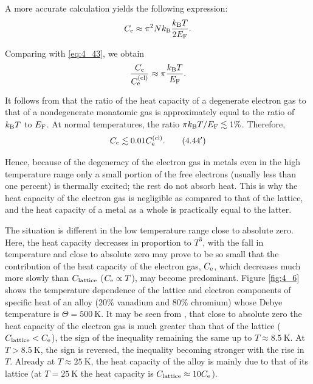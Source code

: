 A more accurate calculation yields the following expression:
\begin{equation}\label{eq:4_43}
    C_{\text{e}} \approx \pi^2 N k_{\text{B}} \frac{k_{\text{B}} T}{2 E_{\text{F}}}.
\end{equation}

\noindent
Comparing  with \eqref{eq:4_43}, we obtain
\begin{equation}\label{eq:4_44}
    \frac{C_{\text{e}}}{C_{\text{e}}^{\text{(cl)}}} \approx \pi \frac{k_{\text{B}} T}{E_{\text{F}}}.
\end{equation}

It follows from  that the ratio of the heat capacity of a degenerate electron gas to that of a nondegenerate monatomic gas is approximately equal to the ratio of $k_{\text{B}}T$ to $E_{\text{F}}$. At normal temperatures, the ratio $\pi k_{\text{B}}T/E_{\text{F}}\lesssim 1\%$. Therefore,
\begin{equation}\label{eq:4_44p}
    C_{\text{e}} \lesssim 0.01 C_{\text{e}}^{\text{(cl)}}. \tag{4.44$'$}
\end{equation}

Hence, because of the degeneracy of the electron gas in metals even in the high temperature range only a small portion of the free electrons (usually less than one percent) is thermally excited; the rest do not absorb heat. This is why the heat capacity of the electron gas is negligible as compared to that of the lattice, and the heat capacity of a metal as a whole is practically equal to the latter.

The situation is different in the low temperature range close to absolute zero. Here, the heat capacity decreases in proportion to $T^3$, with the fall in temperature and close to absolute zero may prove to be so small that the contribution of the heat capacity of the electron gas, $C_{\text{e}}$, which decreases much more slowly than $C_{\text{lattice}}$ ($C_{\text{e}}\propto T$), may become predominant. Figure \ref{fig:4_6} shows the temperature dependence of the lattice and electron components of specific heat of an alloy ($20\%$ vanadium and $80\%$ chromium) whose Debye temperature is $\Theta=\SI{500}{\kelvin}$.
It may be seen from , that close to absolute zero the heat capacity of the electron gas is much greater than that of the lattice ($C_{\text{lattice}}<C_{\text{e}}$), the sign of the inequality remaining the same up to $T\approx\SI{8.5}{\kelvin}$. At $T>\SI{8.5}{\kelvin}$,
the sign is reversed, the inequality becoming stronger with the rise in $T$. Already at $T\approx\SI{25}{\kelvin}$, the heat capacity of the alloy is mainly due to that of its lattice (at $T=\SI{25}{\kelvin}$ the heat capacity is $C_{\text{lattice}}\approx 10C_{\text{e}}$).

